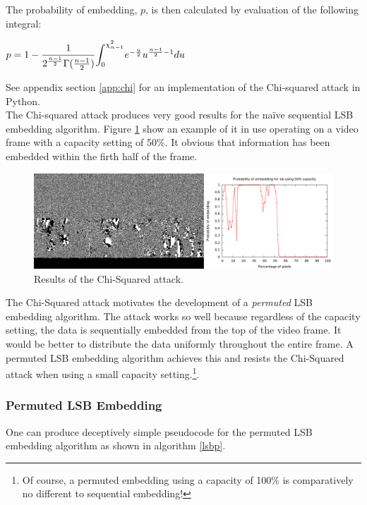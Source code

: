 \documentclass[paper=a4, fontsize=11pt,twoside]{scrartcl}
\numberwithin{table}{section}
\numberwithin{figure}{section}
\numberwithin{algorithm}{section}
\begin{document}
\noindent
The probability of embedding, $p$, is then calculated by evaluation of the following integral:
\begin{center}
$p = 1 - \dfrac{1}{2^{\frac{n-1}{2}} \Gamma (\frac{n-1}{2})} \mathlarger{\int}_{0}^{\chi ^{2} _{n-1}} e^{-\frac{u}{2}}u^{\frac{n-1}{2}-1} du$
\end{center}

\noindent
See appendix section \ref{app:chi} for an implementation of the Chi-squared attack in Python.\\

\noindent
The Chi-squared attack produces very good results for the na\"ive sequential LSB embedding algorithm. Figure \ref{chi} show an example of it in use operating on a video frame with a capacity setting of 50\%. It obvious that information has been embedded within the firth half of the frame.\\

\begin{figure}[here]
\centerline{\includegraphics[width=\textwidth]{images/chi_graph.png}}
\caption{Results of the Chi-Squared attack.}
\label{chi}
\end{figure}

\noindent
The Chi-Squared attack motivates the development of a \textit{permuted} LSB embedding algorithm. The attack works so well because regardless of the capacity setting, the data is sequentially embedded from the top of the video frame. It would be better to distribute the data uniformly throughout the entire frame. A permuted LSB embedding algorithm achieves this and resists the Chi-Squared attack when using a small capacity setting.\footnote{Of course, a permuted embedding using a capacity of 100\% is comparatively no different to sequential embedding!}.

\subsubsection{Permuted LSB Embedding}

One can produce deceptively simple pseudocode for the permuted LSB embedding algorithm as shown in algorithm \ref{lsbp}.
\end{document}
